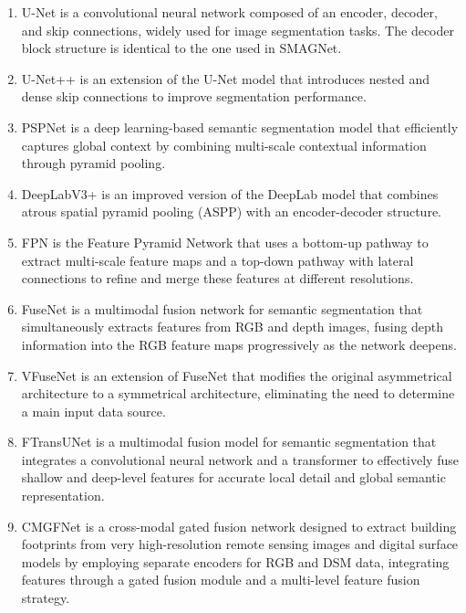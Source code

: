 \documentclass[preprint,12pt,authoryear]{elsarticle}
\begin{document}
\begin{enumerate}
    \renewcommand{\labelenumi}{\arabic{enumi})}  %
    \item U-Net \citep{ronneberger2015u} is a convolutional neural network composed of an encoder, decoder, and skip connections, widely used for image segmentation tasks. The decoder block structure is identical to the one used in SMAGNet.
    \item U-Net++ \citep{zhou2019unetplusplus} is an extension of the U-Net model that introduces nested and dense skip connections to improve segmentation performance. 
    \item PSPNet \citep{zhao2017pyramid} is a deep learning-based semantic segmentation model that efficiently captures global context by combining multi-scale contextual information through pyramid pooling. 
    \item DeepLabV3+ \citep{chen2018encoder} is an improved version of the DeepLab model that combines atrous spatial pyramid pooling (ASPP) with an encoder-decoder structure. 
    \item FPN \citep{lin2017feature} is the Feature Pyramid Network that uses a bottom-up pathway to extract multi-scale feature maps and a top-down pathway with lateral connections to refine and merge these features at different resolutions. 
    \item FuseNet \citep{hazirbas2017fusenet} is a multimodal fusion network for semantic segmentation that simultaneously extracts features from RGB and depth images, fusing depth information into the RGB feature maps progressively as the network deepens. 
    \item VFuseNet \citep{audebert2018beyond} is an extension of FuseNet that modifies the original asymmetrical architecture to a symmetrical architecture, eliminating the need to determine a main input data source.
    \item FTransUNet \citep{ma2024multilevel} is a multimodal fusion model for semantic segmentation that integrates a convolutional neural network and a transformer to effectively fuse shallow and deep-level features for accurate local detail and global semantic representation. 
    \item CMGFNet \citep{hosseinpour2022cmgfnet} is a cross-modal gated fusion network designed to extract building footprints from very high-resolution remote sensing images and digital surface models by employing separate encoders for RGB and DSM data, integrating features through a gated fusion module and a multi-level feature fusion strategy. 

\end{enumerate}
\end{document}
